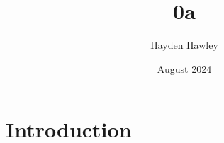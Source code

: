 \documentclass{article}
\title{0a}
\author{Hayden Hawley}
\date{August 2024}
\begin{document}
\maketitle

\section{Introduction}
\end{document}
